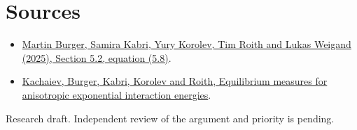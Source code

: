 \documentclass[10pt]{article}
\begin{document}
\section*{Sources}
\begin{itemize}
\item \href{https://arxiv.org/abs/2501.03096}{Martin Burger, Samira Kabri, Yury Korolev, Tim Roith and Lukas Weigand (2025), Section 5.2, equation (5.8)}.
\item \href{https://arxiv.org/abs/2611.19518}{Kachaiev, Burger, Kabri, Korolev and Roith, Equilibrium measures for anisotropic exponential interaction energies}.
\end{itemize}
{\small Research draft. Independent review of the argument and priority is pending.}
\end{document}
